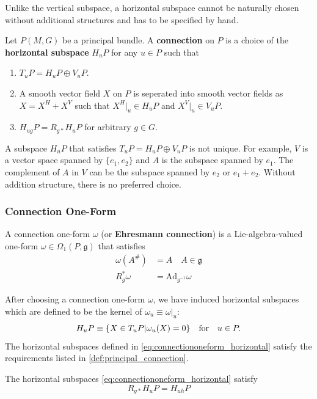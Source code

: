 \documentclass[10pt]{article}
\begin{document}
Unlike the vertical subspace, a horizontal subspace cannot be naturally chosen without additional structures and has to be specified by hand.
\begin{definition}
    Let $P(M,G)$ be a principal bundle.
    A \textbf{connection} on $P$ is a choice of the \textbf{horizontal subspace} $H_u P$ for any $u\in P$ such that 
    \begin{enumerate}
        \item $T_u P=H_u P\oplus V_u P$.
        \item A smooth vector field $X$ on $P$ is seperated into smooth vector fields as $X=X^H+X^V$ such that $X^H\vert_u\in H_u P$ and $X^V\vert_u\in V_u P$.
        \item $H_{ug}P=R_{g\ast}H_u P$ for arbitrary $g\in G$.
    \end{enumerate}
\end{definition}
\begin{remark}
    A subspace $H_u P$ that satisfies $T_u P=H_u P\oplus V_u P$ is not unique.
    For example, $V$ is a vector space spanned by $\{e_1,e_2\}$ and $A$ is the subspace spanned by $e_1$.
    The complement of $A$ in $V$ can be the subspace spanned by $e_2$ or $e_1+e_2$.
    Without addition structure, there is no preferred choice.  
\end{remark}

\subsubsection{Connection One-Form}

\begin{definition}
    A connection one-form $\omega$ (or \textbf{Ehresmann connection}) is a Lie-algebra-valued one-form $\omega\in\Omega_1(P,\mathfrak{g})$ that satisfies
    \begin{subequations}
        \begin{align}
            \omega(A^\#)&=A\quad A\in\mathfrak{g}\\
            R^\ast_g \omega&=\mathrm{Ad}_{g^{-1}}\omega
        \end{align}
    \end{subequations}
\end{definition}
After choosing a connection one-form $\omega$, we have induced horizontal subspaces which are defined to be the kernel of $\omega_u\equiv\omega\vert_u$:
\begin{equation}\label{eq:connectiononeform_horizontal}
    H_u P\equiv\{X\in T_u P\vert \omega_{u}(X)=0\}\qfor u\in P.
\end{equation}
The horizontal subspaces defined in \eqref{eq:connectiononeform_horizontal} satisfy the requirements listed in \cref{def:principal_connection}.
\begin{proposition}
    The horizontal subspaces \eqref{eq:connectiononeform_horizontal} satisfy
    \begin{equation}
        R_{g\ast}H_u P=H_{uh}P
    \end{equation}
\end{proposition}
\end{document}
